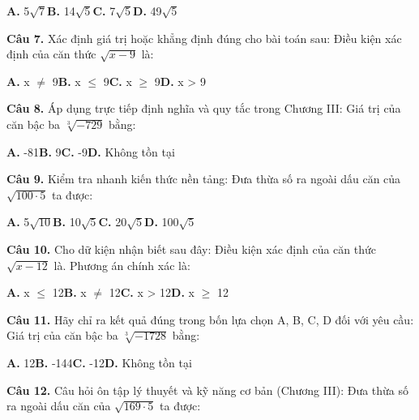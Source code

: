 \documentclass[11pt,a4paper]{article}
\begin{document}
\hspace*{1.5em}\textbf{A.} 5$\sqrt{7}$\quad\quad \textbf{B.} 14$\sqrt{5}$\quad\quad \textbf{C.} 7$\sqrt{5}$\quad\quad \textbf{D.} 49$\sqrt{5}$\par\vspace{2pt}
\textbf{\color{primary} Câu 7.} Xác định giá trị hoặc khẳng định đúng cho bài toán sau: Điều kiện xác định của căn thức $\sqrt{x - 9}$ là:\par
\hspace*{1.5em}\textbf{A.} x $\ne$ 9\quad\quad \textbf{B.} x $\le$ 9\quad\quad \textbf{C.} x $\ge$ 9\quad\quad \textbf{D.} x > 9\par\vspace{2pt}
\textbf{\color{primary} Câu 8.} Áp dụng trực tiếp định nghĩa và quy tắc trong Chương III: Giá trị của căn bậc ba $\sqrt[3]{-729}$ bằng:\par
\hspace*{1.5em}\textbf{A.} -81\quad\quad \textbf{B.} 9\quad\quad \textbf{C.} -9\quad\quad \textbf{D.} Không tồn tại\par\vspace{2pt}
\textbf{\color{primary} Câu 9.} Kiểm tra nhanh kiến thức nền tảng: Đưa thừa số ra ngoài dấu căn của $\sqrt{100  \cdot  5}$ ta được:\par
\hspace*{1.5em}\textbf{A.} 5$\sqrt{10}$\quad\quad \textbf{B.} 10$\sqrt{5}$\quad\quad \textbf{C.} 20$\sqrt{5}$\quad\quad \textbf{D.} 100$\sqrt{5}$\par\vspace{2pt}
\textbf{\color{primary} Câu 10.} Cho dữ kiện nhận biết sau đây: Điều kiện xác định của căn thức $\sqrt{x - 12}$ là. Phương án chính xác là:\par
\hspace*{1.5em}\textbf{A.} x $\le$ 12\quad\quad \textbf{B.} x $\ne$ 12\quad\quad \textbf{C.} x > 12\quad\quad \textbf{D.} x $\ge$ 12\par\vspace{2pt}
\textbf{\color{primary} Câu 11.} Hãy chỉ ra kết quả đúng trong bốn lựa chọn A, B, C, D đối với yêu cầu: Giá trị của căn bậc ba $\sqrt[3]{-1728}$ bằng:\par
\hspace*{1.5em}\textbf{A.} 12\quad\quad \textbf{B.} -144\quad\quad \textbf{C.} -12\quad\quad \textbf{D.} Không tồn tại\par\vspace{2pt}
\textbf{\color{primary} Câu 12.} Câu hỏi ôn tập lý thuyết và kỹ năng cơ bản (Chương III): Đưa thừa số ra ngoài dấu căn của $\sqrt{169  \cdot  5}$ ta được:\par
\end{document}
